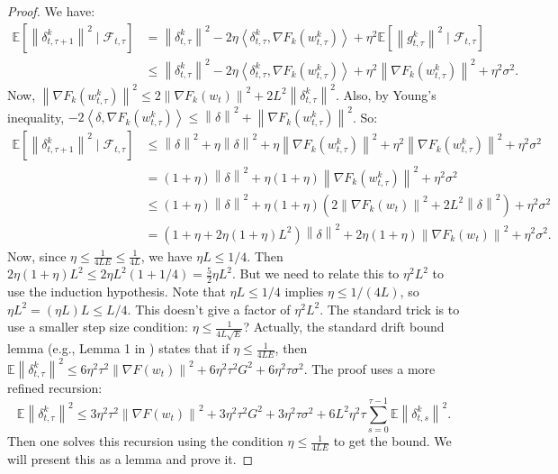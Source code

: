 \documentclass{article}
\newcommand{\norm}[1]{\left\| #1 \right\|}
\newcommand{\inner}[2]{\left\langle #1, #2 \right\rangle}
\begin{document}
\begin{proof}
We have:
\begin{align}
\mathbb{E}[\norm{\delta_{t,\tau+1}^k}^2 \mid \mathcal{F}_{t,\tau}]
&= \norm{\delta_{t,\tau}^k}^2 - 2\eta \inner{\delta_{t,\tau}^k}{\nabla F_k(w_{t,\tau}^k)} + \eta^2 \mathbb{E}[\norm{g_{t,\tau}^k}^2 \mid \mathcal{F}_{t,\tau}] \\
&\le \norm{\delta_{t,\tau}^k}^2 - 2\eta \inner{\delta_{t,\tau}^k}{\nabla F_k(w_{t,\tau}^k)} + \eta^2 \norm{\nabla F_k(w_{t,\tau}^k)}^2 + \eta^2 \sigma^2.
\end{align}
Now, $\norm{\nabla F_k(w_{t,\tau}^k)}^2 \le 2\norm{\nabla F_k(w_t)}^2 + 2L^2 \norm{\delta_{t,\tau}^k}^2$. Also, by Young's inequality, $-2\inner{\delta}{\nabla F_k(w_{t,\tau}^k)} \le \norm{\delta}^2 + \norm{\nabla F_k(w_{t,\tau}^k)}^2$. So:
\begin{align}
\mathbb{E}[\norm{\delta_{t,\tau+1}^k}^2 \mid \mathcal{F}_{t,\tau}]
&\le \norm{\delta}^2 + \eta \norm{\delta}^2 + \eta \norm{\nabla F_k(w_{t,\tau}^k)}^2 + \eta^2 \norm{\nabla F_k(w_{t,\tau}^k)}^2 + \eta^2 \sigma^2 \\
&= (1+\eta) \norm{\delta}^2 + \eta(1+\eta) \norm{\nabla F_k(w_{t,\tau}^k)}^2 + \eta^2 \sigma^2 \\
&\le (1+\eta) \norm{\delta}^2 + \eta(1+\eta) (2\norm{\nabla F_k(w_t)}^2 + 2L^2 \norm{\delta}^2) + \eta^2 \sigma^2 \\
&= \left(1 + \eta + 2\eta(1+\eta)L^2 \right) \norm{\delta}^2 + 2\eta(1+\eta) \norm{\nabla F_k(w_t)}^2 + \eta^2 \sigma^2.
\end{align}
Now, since $\eta \le \frac{1}{4LE} \le \frac{1}{4L}$, we have $\eta L \le 1/4$. Then $2\eta(1+\eta)L^2 \le 2\eta L^2 (1+1/4) = \frac{5}{2} \eta L^2$. But we need to relate this to $\eta^2 L^2$ to use the induction hypothesis. Note that $\eta L \le 1/4$ implies $\eta \le 1/(4L)$, so $\eta L^2 = (\eta L) L \le L/4$. This doesn't give a factor of $\eta^2 L^2$. The standard trick is to use a smaller step size condition: $\eta \le \frac{1}{4L\sqrt{E}}$? Actually, the standard drift bound lemma (e.g., Lemma 1 in \cite{khaled2020tighter}) states that if $\eta \le \frac{1}{4LE}$, then $\mathbb{E}\norm{\delta_{t,\tau}^k}^2 \le 6\eta^2 \tau^2 \norm{\nabla F(w_t)}^2 + 6\eta^2 \tau^2 G^2 + 6\eta^2 \tau \sigma^2$. The proof uses a more refined recursion:
\begin{equation}
    \mathbb{E}\norm{\delta_{t,\tau}^k}^2 \le 3\eta^2 \tau^2 \norm{\nabla F(w_t)}^2 + 3\eta^2 \tau^2 G^2 + 3\eta^2 \tau \sigma^2 + 6L^2 \eta^2 \tau \sum_{s=0}^{\tau-1} \mathbb{E}\norm{\delta_{t,s}^k}^2.
\end{equation}
Then one solves this recursion using the condition $\eta \le \frac{1}{4LE}$ to get the bound. We will present this as a lemma and prove it.


\end{proof}
\end{document}

